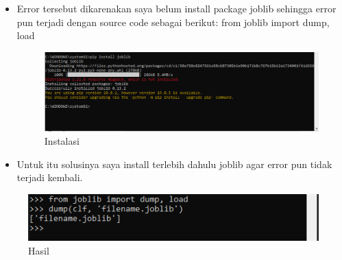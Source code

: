 \begin{itemize}
\item Error tersebut dikarenakan saya belum install package joblib sehingga error pun terjadi dengan source code sebagai berikut:
from joblib import dump, load

\begin{figure}[ht]
\centering
\includegraphics[scale=0.5]{figures/i21.png}
\caption{Instalasi}
\end{figure}

\item Untuk itu solusinya saya install terlebih dahulu joblib agar error pun tidak terjadi kembali.
\end{itemize}

\begin{figure}[ht]
\centering
\includegraphics[scale=0.5]{figures/i22.png}
\caption{Hasil}
\end{figure}

